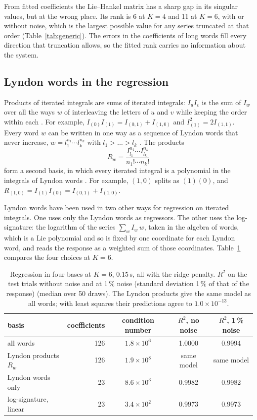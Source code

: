 \documentclass[11pt,a4paper]{article}
\theoremstyle{remark}
\begin{document}
From fitted coefficients the Lie--Hankel matrix has a sharp gap in its singular values, but at the wrong place.
Its rank is 6 at $K=4$ and 11 at $K=6$, with or without noise, which is the largest possible value for any series truncated at that order (Table~\ref{tab:generic}).
The errors in the coefficients of long words fill every direction that truncation allows, so the fitted rank carries no information about the system.

\subsection{Lyndon words in the regression}
Products of iterated integrals are sums of iterated integrals: $I_uI_v$ is the sum of $I_w$ over all the ways $w$ of interleaving the letters of $u$ and $v$ while keeping the order within each \cite{Ree1958}.
For example, $I_{(0)}I_{(1)}=I_{(0,1)}+I_{(1,0)}$ and $I_{(1)}^2=2I_{(1,1)}$.
Every word $w$ can be written in one way as a sequence of Lyndon words that never increase, $w=l_1^{n_1}\cdots l_k^{n_k}$ with $l_1>\dots>l_k$ \cite{ChenFoxLyndon1958}.
The products
\[R_w=\frac{I_{l_1}^{n_1}\cdots I_{l_k}^{n_k}}{n_1!\cdots n_k!}\]
form a second basis, in which every iterated integral is a polynomial in the integrals of Lyndon words \cite{Radford1979,Reutenauer1993}.
For example, $(1,0)$ splits as $(1)(0)$, and $R_{(1,0)}=I_{(1)}I_{(0)}=I_{(0,1)}+I_{(1,0)}$.

Lyndon words have been used in two other ways for regression on iterated integrals.
One uses only the Lyndon words as regressors.
The other uses the log-signature: the logarithm of the series $\sum_wI_w\,w$, taken in the algebra of words, which is a Lie polynomial and so is fixed by one coordinate for each Lyndon word, and reads the response as a weighted sum of those coordinates.
Table~\ref{tab:lynreg} compares the four choices at $K=6$.

\begin{table}[t]\centering\small
\caption{Regression in four bases at $K=6$, 0.15\,s, all with the ridge penalty. $R^2$ on the test trials without noise and at 1\,\% noise (standard deviation 1\,\% of that of the response) (median over 50 draws). The Lyndon products give the same model as all words; with least squares their predictions agree to $1.0\times10^{-13}$.}\label{tab:lynreg}
\begin{tabular}{lrccc}\toprule
basis & coefficients & condition number & $R^2$, no noise & $R^2$, 1\,\% noise\\\midrule
all words & 126 & $1.8\times10^{6}$ & 1.0000 & 0.9994\\
Lyndon products $R_w$ & 126 & $1.9\times10^{8}$ & same model & same model\\
Lyndon words only & 23 & $8.6\times10^{3}$ & 0.9982 & 0.9982\\
log-signature, linear & 23 & $3.4\times10^{2}$ & 0.9973 & 0.9973\\
\bottomrule\end{tabular}
\end{table}
\end{document}
